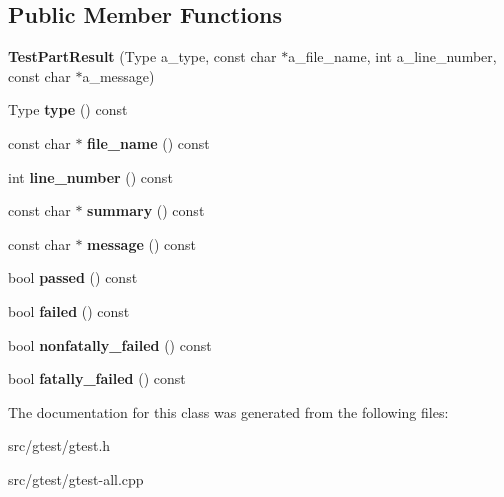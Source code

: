 \subsection*{Public Member Functions}
\begin{DoxyCompactItemize}
\item 
\mbox{\label{classtesting_1_1_test_part_result_a6409eb519c1cd514aab2426c8f40737f}} 
{\bfseries Test\+Part\+Result} (Type a\+\_\+type, const char $\ast$a\+\_\+file\+\_\+name, int a\+\_\+line\+\_\+number, const char $\ast$a\+\_\+message)
\item 
\mbox{\label{classtesting_1_1_test_part_result_aab92b225e8a472e78bd3889ca6df0d2a}} 
Type {\bfseries type} () const
\item 
\mbox{\label{classtesting_1_1_test_part_result_a0be40512f50a0086c4d3dc43938978aa}} 
const char $\ast$ {\bfseries file\+\_\+name} () const
\item 
\mbox{\label{classtesting_1_1_test_part_result_ad4c5da5f13245ac18cf256d0d9f3eda9}} 
int {\bfseries line\+\_\+number} () const
\item 
\mbox{\label{classtesting_1_1_test_part_result_a655ab538e510434ba557ad66c35aa42c}} 
const char $\ast$ {\bfseries summary} () const
\item 
\mbox{\label{classtesting_1_1_test_part_result_a5019dc9d753aba5949777270de255d49}} 
const char $\ast$ {\bfseries message} () const
\item 
\mbox{\label{classtesting_1_1_test_part_result_ac90edd5ea9cc4bb986a1eb2b5e1d53de}} 
bool {\bfseries passed} () const
\item 
\mbox{\label{classtesting_1_1_test_part_result_aa04b377c3e7ed57d39e882df5561ac90}} 
bool {\bfseries failed} () const
\item 
\mbox{\label{classtesting_1_1_test_part_result_a6197c7f6672acc1cfdf580eb1f2183ac}} 
bool {\bfseries nonfatally\+\_\+failed} () const
\item 
\mbox{\label{classtesting_1_1_test_part_result_a77db157eff9531c3c00c2420502f9a89}} 
bool {\bfseries fatally\+\_\+failed} () const
\end{DoxyCompactItemize}


The documentation for this class was generated from the following files\+:\begin{DoxyCompactItemize}
\item 
src/gtest/gtest.\+h\item 
src/gtest/gtest-\/all.\+cpp\end{DoxyCompactItemize}
